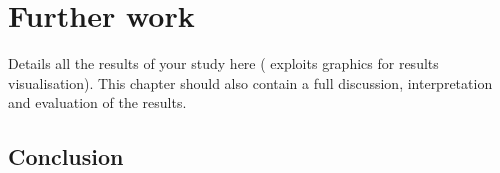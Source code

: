 
\chapter{Further work}
\label{chap:furtherwork}
\ifpdf
    \graphicspath{{Chapter4/Figures/PNG/}{Chapter3/Figures/PDF/}{Chapter4/Figures/}}
\else
    \graphicspath{{Chapter4/Figures/EPS/}{Chapter3/Figures/}}
\fi


Details all the results of your study here ( exploits graphics for results visualisation). 
This chapter should also contain a full discussion, interpretation and evaluation of the results. 


\section{Conclusion}
\label{sec:conclusion}



